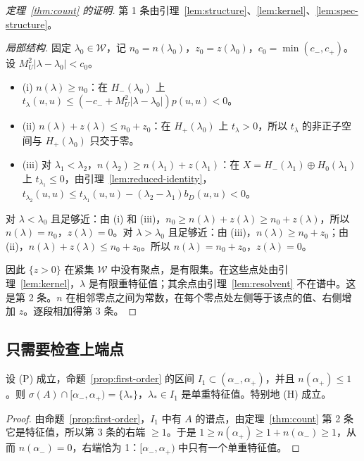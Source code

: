 \documentclass[11pt,a4paper,fontset=fandol]{ctexart}
\begin{document}
\begin{proof}[定理~\ref{thm:count} 的证明]
第 1 条由引理~\ref{lem:structure}、\ref{lem:kernel}、\ref{lem:spec-structure}。

\emph{局部结构.} 固定 $\lambda_0\in\mathcal W$，记 $n_0=n(\lambda_0)$，$z_0=z(\lambda_0)$，$c_0=\min(c_-,c_+)$。设 $M_U^2|\lambda-\lambda_0|<c_0$。
\begin{itemize}
\item (i) $n(\lambda)\ge n_0$：在 $H_-(\lambda_0)$ 上 $t_\lambda(u,u)\le(-c_-+M_U^2|\lambda-\lambda_0|)p(u,u)<0$。
\item (ii) $n(\lambda)+z(\lambda)\le n_0+z_0$：在 $H_+(\lambda_0)$ 上 $t_\lambda>0$，所以 $t_\lambda$ 的非正子空间与 $H_+(\lambda_0)$ 只交于零。
\item (iii) 对 $\lambda_1<\lambda_2$，$n(\lambda_2)\ge n(\lambda_1)+z(\lambda_1)$：在 $X=H_-(\lambda_1)\oplus H_0(\lambda_1)$ 上 $t_{\lambda_1}\le0$，由引理~\ref{lem:reduced-identity}，$t_{\lambda_2}(u,u)\le t_{\lambda_1}(u,u)-(\lambda_2-\lambda_1)b_D(u,u)<0$。
\end{itemize}
对 $\lambda<\lambda_0$ 且足够近：由 (i) 和 (iii)，$n_0\ge n(\lambda)+z(\lambda)\ge n_0+z(\lambda)$，所以 $n(\lambda)=n_0$，$z(\lambda)=0$。对 $\lambda>\lambda_0$ 且足够近：由 (iii)，$n(\lambda)\ge n_0+z_0$；由 (ii)，$n(\lambda)+z(\lambda)\le n_0+z_0$。所以 $n(\lambda)=n_0+z_0$，$z(\lambda)=0$。

因此 $\{z>0\}$ 在紧集 $\mathcal W$ 中没有聚点，是有限集。在这些点处由引理~\ref{lem:kernel}，$\lambda$ 是有限重特征值；其余点由引理~\ref{lem:resolvent} 不在谱中。这是第 2 条。$n$ 在相邻零点之间为常数，在每个零点处左侧等于该点的值、右侧增加 $z$。逐段相加得第 3 条。
\end{proof}

\subsection{只需要检查上端点}

\begin{corollary}[(H) 的有限判据]
\label{cor:H-criterion}
设 (P) 成立，命题~\ref{prop:first-order} 的区间 $I_1\subset(\alpha_-,\alpha_+)$，并且 $n(\alpha_+)\le1$。则 $\sigma(A)\cap[\alpha_-,\alpha_+)=\{\lambda_*\}$，$\lambda_*\in I_1$ 是单重特征值。特别地 (H) 成立。
\end{corollary}

\begin{proof}
由命题~\ref{prop:first-order}，$I_1$ 中有 $A$ 的谱点，由定理~\ref{thm:count} 第 2 条它是特征值，所以第 3 条的右端 $\ge1$。于是 $1\ge n(\alpha_+)\ge1+n(\alpha_-)\ge1$，从而 $n(\alpha_-)=0$，右端恰为 1：$[\alpha_-,\alpha_+)$ 中只有一个单重特征值。
\end{proof}
\end{document}
